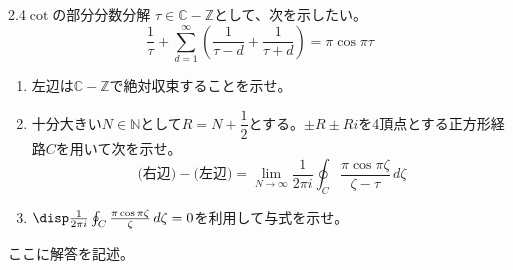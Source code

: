 \begin{prob}{2.4}{}{$\cot$の部分分数分解}
 $\tau\in\mathbb{C}-\mathbb{Z}$として、次を示したい。
 \[ \frac{1}{\tau}+\sum_{d=1}^\infty\left(\frac{1}{\tau-d}+\frac{1}{\tau+d}\right)=\pi\cos\pi\tau \]
 \begin{enumerate}
  \item 左辺は$\mathbb{C}-\mathbb{Z}$で絶対収束することを示せ。
  \item 十分大きい$N\in\mathbb{N}$として$R=N+\dfrac{1}{2}$とする。$\pm R\pm Ri$を4頂点とする正方形経路$C$を用いて次を示せ。
	\[ \text{(右辺)}-\text{(左辺)}=\lim_{N\to\infty}\frac{1}{2\pi i}\oint_C\!\frac{\pi\cos\pi\zeta}{\zeta-\tau} \,d\zeta \]
  \item $\disp \frac{1}{2\pi i}\oint_C \frac{\pi\cos\pi\zeta}{\zeta} \,d\zeta=0$を利用して与式を示せ。
 \end{enumerate}
\end{prob}
ここに解答を記述。
